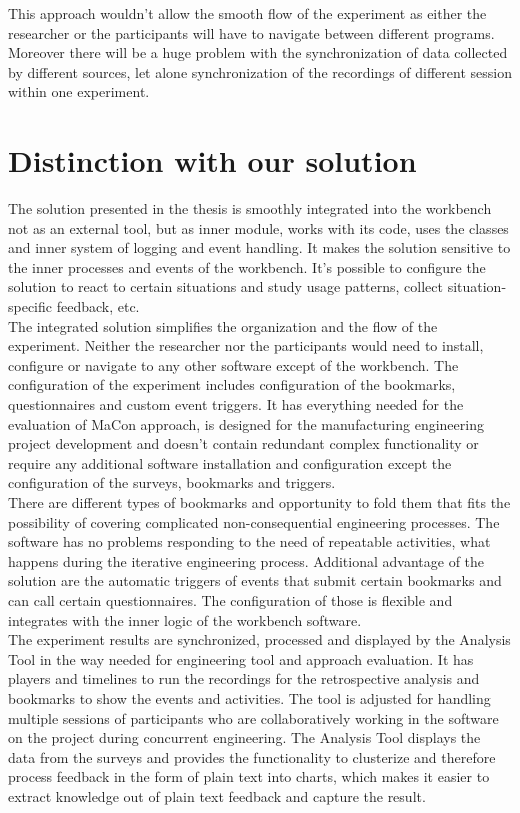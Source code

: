 This approach wouldn't allow the smooth flow of the experiment as either the researcher or the participants will have to navigate between different programs. Moreover there will be a huge problem with the synchronization of data collected by different sources, let alone synchronization of the recordings of different session within one experiment. \\ 

\section{Distinction with our solution }\label{section:distinction}

The solution presented in the thesis is smoothly integrated into the workbench not as an external tool, but as inner module, works with its code, uses the classes and inner system of logging and event handling. It makes the solution sensitive to the inner processes and events of the workbench. It's possible to configure the solution to react to certain situations and study usage patterns, collect situation-specific feedback, etc.\\

The integrated solution simplifies the organization and the flow of the experiment. Neither the researcher nor the participants would need to install, configure or navigate to any other software except of the workbench. The configuration of the experiment includes configuration of the bookmarks, questionnaires and custom event triggers. It has everything needed for the evaluation of MaCon approach, is designed for the manufacturing engineering project development and doesn't contain redundant complex functionality or require any additional software installation and configuration except the configuration of the surveys, bookmarks and triggers.\\ 

There are different types of bookmarks and opportunity to fold them that fits the possibility of covering complicated non-consequential engineering processes. The software has no problems responding to the need of repeatable activities, what happens during the iterative engineering process. Additional advantage of the solution are the automatic triggers of events that submit certain bookmarks and can call certain questionnaires. The configuration of those is flexible and integrates with the inner logic of the workbench software. \\

The experiment results are synchronized, processed and displayed by the Analysis Tool in the way needed for engineering tool and approach evaluation. It has players and timelines to run the recordings for the retrospective analysis and bookmarks to show the events and activities. The tool is adjusted for handling multiple sessions of participants who are collaboratively working in the software on the project during concurrent engineering. The Analysis Tool displays the data from the surveys and provides the functionality to clusterize and therefore process feedback in the form of plain text into charts, which makes it easier to extract knowledge out of plain text feedback and capture the result.